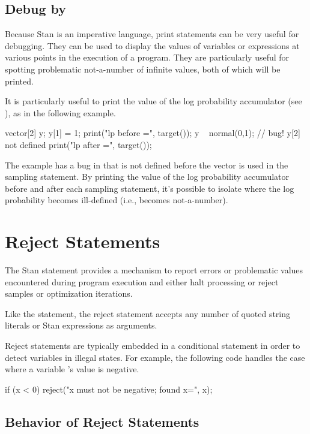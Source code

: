 \subsection{Debug by }

Because Stan is an imperative language, print statements can be very
useful for debugging.  They can be used to display the values of
variables or expressions at various points in the execution of a
program.  They are particularly useful for spotting problematic
not-a-number of infinite values, both of which will be printed.

It is particularly useful to print the value of the log probability
accumulator (see ), as in the following example.
%
\begin{stancode}
vector[2] y;
y[1] = 1;
print("lp before =", target());
y ~ normal(0,1);  // bug!  y[2] not defined
print("lp after =", target());
\end{stancode}
%
The example has a bug in that  is not defined before the
vector  is used in the sampling statement.  By printing the
value of the log probability accumulator before and after each
sampling statement, it's possible to isolate where the log probability
becomes ill-defined (i.e., becomes not-a-number).

\section{Reject Statements}\label{reject-statements.section}

The Stan  statement provides a mechanism to
report errors or problematic values encountered during program
execution and either halt processing or reject samples or optimization
iterations.

Like the  statement, the reject statement accepts
any number of quoted string literals or Stan expressions as arguments.

Reject statements are typically embedded in a conditional
statement in order to detect variables in illegal states.  For
example, the following code handles the case where a variable 's
value is negative.
%
\begin{stancode}
if (x < 0)
  reject("x must not be negative; found x=", x);
\end{stancode}

\subsection{Behavior of Reject Statements}

